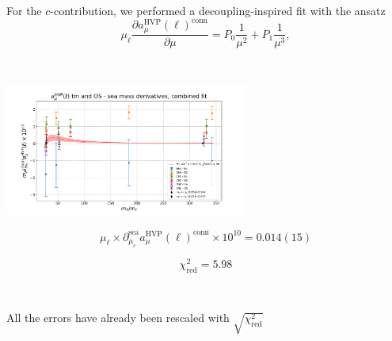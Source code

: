 \documentclass[xcolor={dvipsnames,table}]{beamer}
\begin{document}
\begin{frame}
  \centering
  For the $c$-contribution, we performed a decoupling-inspired fit with the ansatz
  \[
    \mu_\ell  \frac{\partial a_\mu^\mathrm{HVP}(\ell)^\mathrm{conn} }{\partial\mu} = P_0\frac{1}{\mu^2}+P_1\frac{1}{\mu^3},
  \]

  \

  \includegraphics[trim=0cm 0.3cm 0cm 1.2cm, clip,width=0.6\textwidth]{plots/der_mq_sea_lore/fit_amu_der_mc_full.png}

  $$\mu_\ell\times\partial^\mathrm{sea}_{\mu_c}a^\mathrm{HVP}_\mu(\ell)^\mathrm{conn}\times10^{10} = 0.014(15)$$

  $$\chi^2_\mathrm{red}=5.98$$

  \

  All the errors have already been rescaled with $\sqrt{\chi^2_\mathrm{red}}$
\end{frame}
\end{document}
